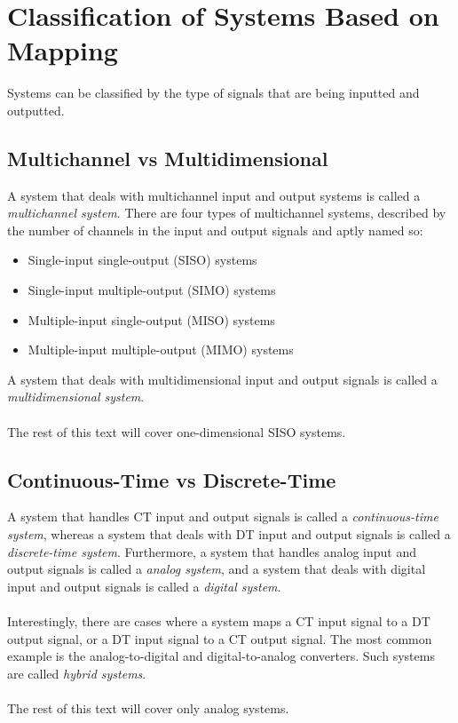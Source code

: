 \documentclass{report}
\begin{document}
\section{Classification of Systems Based on Mapping}
Systems can be classified by the type of signals that are being inputted and outputted.

\subsection{Multichannel vs Multidimensional}
A system that deals with multichannel input and output systems is called a \emph{multichannel system}. There are four types of multichannel systems, described by the number 
of channels in the input and output signals and aptly named so:
\begin{itemize}
    \item Single-input single-output (SISO) systems
    \item Single-input multiple-output (SIMO) systems
    \item Multiple-input single-output (MISO) systems
    \item Multiple-input multiple-output (MIMO) systems
\end{itemize}
A system that deals with multidimensional input and output signals is called a \emph{multidimensional system}. 
\\ \\
The rest of this text will cover one-dimensional SISO systems.

\subsection{Continuous-Time vs Discrete-Time}
A system that handles CT input and output signals is called a \emph{continuous-time system}, whereas a system that deals with DT input and output signals 
is called a \emph{discrete-time system}. Furthermore, a system that handles analog input and output signals is called a \emph{analog system}, and a system 
that deals with digital input and output signals is called a \emph{digital system}. 
\\ \\
Interestingly, there are cases where a system maps a CT input signal to a DT output signal, or a DT input signal to a CT output signal. The most common example is 
the analog-to-digital and digital-to-analog converters. Such systems are called \emph{hybrid systems}.
\\ \\
The rest of this text will cover only analog systems.
\end{document}
